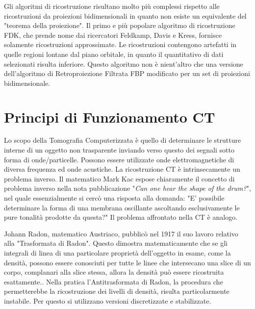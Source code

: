 \documentclass[a4paper,12pt, doubleside]{report}
\begin{document}
                \par
                    Gli algoritmi di ricostruzione risultano molto più complessi rispetto alle ricostruzioni da proiezioni bidimensionali in quanto non esiste un equivalente del "teorema della proiezione".
                    Il primo e più popolare algoritmo di ricostruzione FDK, che prende nome dai ricercatori Feldkamp, Davis e Kress, fornisce solamente ricostruzioni approssimate. Le ricostruzioni contengono artefatti in quelle regioni lontane dal piano orbitale, in quanto il quantitativo di dati selezionati risulta inferiore.
                    Questo algoritmo non è nient'altro che una versione dell'algoritmo di Retroproiezione Filtrata FBP modificato per un set di proiezioni bidimensionale.   
                                            
        \section{Principi di Funzionamento CT}
            \par
                Lo scopo della Tomografia Computerizzata è quello di determinare le strutture interne di un oggetto non trasparente inviando verso questo dei segnali sotto forma di onde/particelle. Possono essere utilizzate onde elettromagnetiche di diversa frequenza ed onde acustiche. La ricostruzione CT è intrinsecamente un problema inverso.
                Il matematico Mark Kac espose chiaramente il concetto di problema inverso nella nota pubblicazione "\textit{Can one hear the shape of the drum?}"\cite{mark-kac}, nel quale essenzialmente si cercò una risposta alla domanda: "E' possibile determinare la forma di una membrana oscillante ascoltando esclusivamente le pure tonalità prodotte da questa?" Il problema affrontato nella CT è analogo.
            
            \bigskip
            \par
                Johann Radon, matematico Austriaco, pubblicò nel 1917 il suo lavoro relativo alla "Trasformata di Radon". Questo dimostra matematicamente che se gli integrali di linea di una particolare proprietà dell'oggetto in esame, come la densità, possono essere conosciuti per tutte le linee che intersecano una slice di un corpo, complanari alla slice stessa, allora la densità può essere ricostruita esattamente.\cite{history-radiology}. Nella pratica l'Antitrasformata di Radon, la procedura che permetterebbe la ricostruzione dei livelli di densità, risulta particolarmente instabile. Per questo si utilizzano versioni discretizzate e stabilizzate.
                
\end{document}
